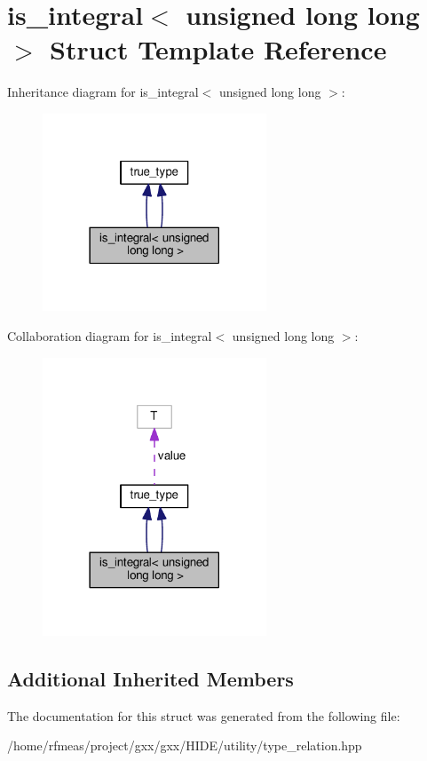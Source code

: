 \hypertarget{structis__integral_3_01unsigned_01long_01long_01_4}{}\section{is\+\_\+integral$<$ unsigned long long $>$ Struct Template Reference}
\label{structis__integral_3_01unsigned_01long_01long_01_4}


Inheritance diagram for is\+\_\+integral$<$ unsigned long long $>$\+:
\nopagebreak
\begin{figure}[H]
\begin{center}
\leavevmode
\includegraphics[width=189pt]{structis__integral_3_01unsigned_01long_01long_01_4__inherit__graph}
\end{center}
\end{figure}


Collaboration diagram for is\+\_\+integral$<$ unsigned long long $>$\+:
\nopagebreak
\begin{figure}[H]
\begin{center}
\leavevmode
\includegraphics[width=189pt]{structis__integral_3_01unsigned_01long_01long_01_4__coll__graph}
\end{center}
\end{figure}
\subsection*{Additional Inherited Members}


The documentation for this struct was generated from the following file\+:\begin{DoxyCompactItemize}
\item 
/home/rfmeas/project/gxx/gxx/\+H\+I\+D\+E/utility/type\+\_\+relation.\+hpp\end{DoxyCompactItemize}

